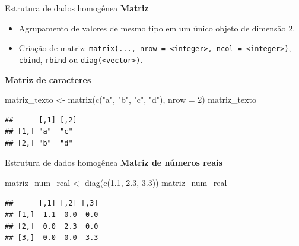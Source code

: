 \documentclass[
  10pt,
  ignorenonframetext,
]{beamer}
\newenvironment{Shaded}{}{}
\newcommand{\DataTypeTok}[1]{#1}
\newcommand{\DecValTok}[1]{#1}
\newcommand{\FloatTok}[1]{#1}
\newcommand{\KeywordTok}[1]{\textcolor[rgb]{0.00,0.00,1.00}{#1}}
\newcommand{\NormalTok}[1]{#1}
\newcommand{\StringTok}[1]{\textcolor[rgb]{0.00,0.50,0.50}{#1}}
\providecommand{\tightlist}{%
  \setlength{\itemsep}{0pt}\setlength{\parskip}{0pt}}
\begin{document}
\begin{frame}[fragile]{Estrutura de dados homogênea}
\protect\hypertarget{estrutura-de-dados-homoguxeanea-4}{}
\textbf{Matriz}

\begin{itemize}
\tightlist
\item
  Agrupamento de valores de mesmo tipo em um único objeto de dimensão 2.
\item
  Criação de matriz:
  \texttt{matrix(...,\ nrow\ =\ \textless{}integer\textgreater{},\ ncol\ =\ \textless{}integer\textgreater{})},
  \texttt{cbind}, \texttt{rbind} ou
  \texttt{diag(\textless{}vector\textgreater{})}.
\end{itemize}

\textbf{Matriz de caracteres}

\begin{Shaded}
\begin{Highlighting}[]
\NormalTok{matriz\_texto \textless{}{-}}\StringTok{ }\KeywordTok{matrix}\NormalTok{(}\KeywordTok{c}\NormalTok{(}\StringTok{"a"}\NormalTok{, }\StringTok{"b"}\NormalTok{, }\StringTok{"c"}\NormalTok{, }\StringTok{"d"}\NormalTok{), }\DataTypeTok{nrow =} \DecValTok{2}\NormalTok{)}
\NormalTok{matriz\_texto}
\end{Highlighting}
\end{Shaded}

\begin{verbatim}
##      [,1] [,2]
## [1,] "a"  "c" 
## [2,] "b"  "d"
\end{verbatim}
\end{frame}

\begin{frame}[fragile]{Estrutura de dados homogênea}
\protect\hypertarget{estrutura-de-dados-homoguxeanea-5}{}
\textbf{Matriz de números reais}

\begin{Shaded}
\begin{Highlighting}[]
\NormalTok{matriz\_num\_real \textless{}{-}}\StringTok{ }\KeywordTok{diag}\NormalTok{(}\KeywordTok{c}\NormalTok{(}\FloatTok{1.1}\NormalTok{, }\FloatTok{2.3}\NormalTok{, }\FloatTok{3.3}\NormalTok{))}
\NormalTok{matriz\_num\_real}
\end{Highlighting}
\end{Shaded}

\begin{verbatim}
##      [,1] [,2] [,3]
## [1,]  1.1  0.0  0.0
## [2,]  0.0  2.3  0.0
## [3,]  0.0  0.0  3.3
\end{verbatim}
\end{frame}
\end{document}
